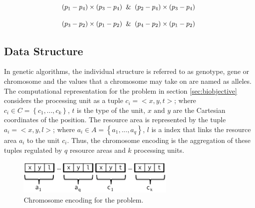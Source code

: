 \documentclass{llncs}
\begin{document}
\begin{equation}
\left(p_1-p_4\right)\times\left(p_3-p_4\right) \And \left(p_2-p_4\right) \times \left(p_3-p_4\right)
\end{equation}

\begin{equation}
\left(p_3-p_2\right)\times\left(p_1-p_2\right) \And \left(p_4-p_2\right) \times \left(p_1-p_2\right)
\end{equation}




 



\subsection{Data Structure}


In genetic algorithms, the individual structure is referred to as genotype, gene or chromosome and the values that a chromosome may take on are named as alleles. The computational representation for the problem in section \ref{sec:biobjective} considers the processing unit as a tuple $c_i=<x, y, t>$; where $c_i \in C=\left\{c_1,...,c_k\right\}$, $t$ is the type of the unit, $x \text{ and }y$ are the Cartesian coordinates of the position. The resource area is represented by the tuple $a_i=<x, y, l>$; where $a_i \in A=\left\{a_1,...,a_q\right\}$, $l$ is a index that links the resource area $a_i$ to the unit $c_i$. Thus, the chromosome encoding is the aggregation of these tuples regulated by $q$ resource areas and $k$ processing units.



\begin{figure}
\centering
\includegraphics[height=.5in,width=3in]{gene1.png}
\caption{Chromosome encoding for the problem.}
\label{fig:gene}
\end{figure}
\FloatBarrier
\end{document}
